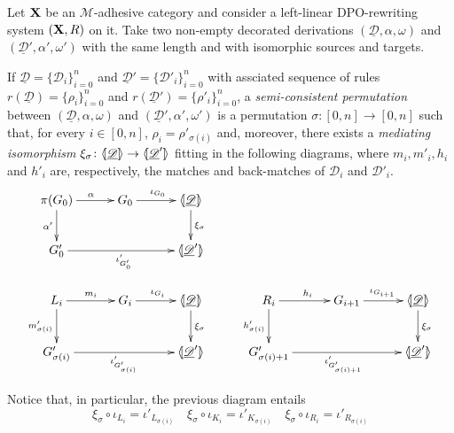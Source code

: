 \documentclass[a4paper,UKenglish,cleveref,pdftex,thm-restate,numberwithinsect]{lipics-v2021}
\def\R{\mathsf{R}}
\def\X{\textbf {\textup{X}}}
\def\G{\textbf {\textup{G}}}
\newcommand{\dder}[1]{\mathscr{#1}}
\newcommand{\der}[1]{\underline{\dder{#1}}}
\newcommand{\lpro}{\langle \hspace{-1.85pt}[}
\newcommand{\rpro}{]\hspace{-1.85pt}\rangle}
\newcommand{\tpro}[1]{\lpro \der{#1}\rpro}
\begin{document}
\newpage
\begin{definition}Let $\X$ be an $\mathcal{M}$-adhesive category and consider a left-linear DPO-rewriting system $(\X, \R)$ on it.  Take two non-empty decorated derivations $(\der{D}, \alpha, \omega)$ and  $(\der{D}', \alpha', \omega')$ with the same length and with isomorphic sources and targets.
	
	If $\der{D}=\{\dder{D}_i\}_{i=0}^n$ and $\der{D}'=\{\dder{D}'_i\}_{i=0}^n$ with assciated sequence of rules $r(\der{D})=\{\rho_i\}_{i=0}^n$ and $r(\der{D}')=\{\rho'_i\}_{i=0}^n$, a \emph{semi-consistent permutation} between  $(\der{D}, \alpha, \omega)$ and $(\der{D}', \alpha', \omega')$ is a permutation $\sigma\colon [0,n]\to [0,n]$  such that, for every $i\in [0,n]$, $\rho_i=\rho'_{\sigma(i)}$ and, moreover, there exists a \emph{mediating isomorphism} $\xi_\sigma\colon \tpro{D} \to \lpro \der{D}' \rpro$ fitting in the following diagrams, where $m_i, m'_i, h_i$ and $h'_i$ are, respectively, the matches and back-matches of $\dder{D}_i$ and $\dder{D}'_i$.
	\[\xymatrix@C=30pt{\pi(G_0)\ar[r]^{\alpha} \ar[d]_{\alpha'} & G_0 \ar[r]^{\iota_{G_0}} &\tpro{D} \ar[d]^{\xi_\sigma}\\ G'_0 \ar[rr]_{\iota'_{G'_0}} & &\lpro \der{D}' \rpro\\L_i \ar[r]^{m_i} \ar[d]_{m'_{\sigma(i)}}& G_i \ar[r]^{\iota_{G_i}} &\tpro{D} \ar[d]^{\xi_\sigma} & R_i \ar[r]^{h_i} \ar[d]_{h'_{\sigma(i)}}& G_{i+1} \ar[r]^{\iota_{G_{i+1}}} &\tpro{D} \ar[d]^{\xi_\sigma} \\G'_{\sigma(i)} \ar[rr]_{\iota'_{G'_{\sigma(i)}}}&& \lpro \der{D}' \rpro& G'_{\sigma(i)+1} \ar[rr]_{\iota'_{G'_{\sigma(i)+1}}}&& \lpro \der{D}' \rpro}\]
\end{definition}

\begin{remark}\label{rem:coproj}
	Notice that, in particular, the previous diagram entails
	\[\xi_\sigma \circ \iota_{L_i}=\iota'_{L_{\sigma(i)}} \quad \xi_\sigma \circ \iota_{K_i}=\iota'_{K_{\sigma(i)}} \quad \xi_\sigma \circ \iota_{R_i}=\iota'_{R_{\sigma(i)}} \]
\end{remark}
\end{document}

